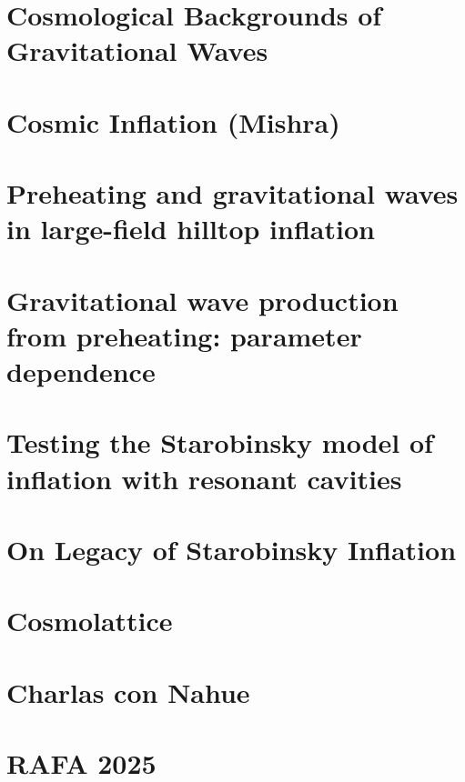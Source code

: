 \documentclass[10pt]{article}
\begin{document}
    
    
    \tableofcontents
    
    \newpage
    
    \section{Cosmological Backgrounds of Gravitational Waves}
        

    \section{Cosmic Inflation (Mishra)}
        
        
    \section{Preheating and gravitational waves in large-field hilltop inflation}
        

    \section{Gravitational wave production from preheating: parameter dependence}
        
    
        \section{Testing the Starobinsky model of inflation with resonant cavities}
        

    \section{On Legacy of Starobinsky Inflation}
        

    \section{Cosmolattice}
        

    \section{Charlas con Nahue}
        

    \section{RAFA 2025}
        
\end{document}
